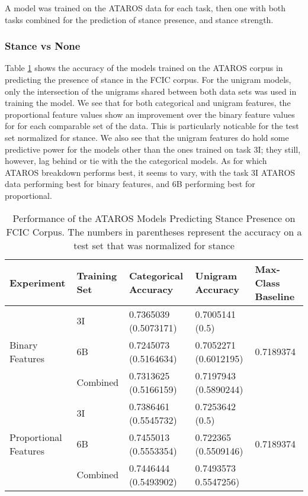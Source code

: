 A model was trained on the ATAROS data for each task, then one with both tasks combined for the prediction of stance presence, and stance strength.  

\subsubsection{Stance vs None}  

Table \ref{tab:fcic_acc_SVN} shows the accuracy of the models trained on the ATAROS corpus in predicting the presence of stance in the FCIC corpus.  For the unigram models, only the intersection of the unigrams shared between both data sets was used in training the model.  We see that for both categorical and unigram features, the proportional feature values show an improvement over the binary feature values for for each comparable set of the data.  This is particularly noticable for the test set normalized for stance.  We also see that the unigram features do hold some predictive power for the models other than the ones trained on task 3I; they still, however, lag behind or tie with the the categorical models.  As for which ATAROS breakdown performs best, it seems to vary, with the task 3I ATAROS data performing best for binary features, and 6B performing best for proportional.  


\begin{table}[h]
\centering
\begin{tabular}{l | l | l | l | l  } 
	\textbf{Experiment}  & \textbf{Training Set} & \textbf{Categorical Accuracy} &  \textbf{Unigram Accuracy} & \textbf{Max-Class Baseline} \\ 
	\hline 
	\multirow{3}{*}{Binary Features}
		& 3I & \num{0.7365039} (\num{0.5073171}) & \num{0.7005141} (\num{0.5}) & \multirow{3}{*}{\num{0.7189374}} \\ 
	    & 6B & \num{0.7245073} (\num{0.5164634}) & \num{0.7052271} (\num{0.6012195}) & \\ 
	    & Combined & \num{0.7313625} (\num{0.5166159}) & \num{0.7197943} (\num{0.5890244}) & \\  
	\hline
	\multirow{3}{*}{Proportional Features}
		& 3I & \num{0.7386461} (\num{0.5545732}) & \num{0.7253642} (\num{0.5}) & \multirow{3}{*}{\num{0.7189374}} \\ 
	    & 6B & \num{0.7455013} (\num{0.5553354}) & \num{0.722365} (\num{0.5509146}) & \\ 
	    & Combined & \num{0.7446444} (\num{0.5493902}) & \num{0.7493573} \num{0.5547256}) & \\  
\end{tabular}	
\caption{Performance of the ATAROS Models Predicting Stance Presence on FCIC Corpus.  The numbers in parentheses represent the accuracy on a test set that was normalized for stance} 
\label{tab:fcic_acc_SVN} 
\end{table}

